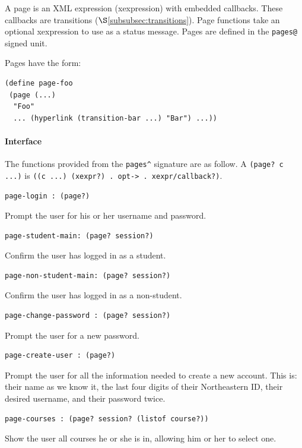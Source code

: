 \documentclass[a4paper]{article}
\begin{document}
A page is an XML expression (xexpression) with embedded callbacks. These callbacks
are transitions ($\S$\ref{subsubsec:transitions}). Page functions take an
optional xexpression to use as a status message. Pages are defined in the
\verb|pages@| signed unit.

Pages have the form:

\begin{verbatim}
(define page-foo 
 (page (...)
  "Foo"
  ... (hyperlink (transition-bar ...) "Bar") ...))
\end{verbatim}

\paragraph{Interface}\label{para:pages-interface}

The functions provided from the \verb|pages^| signature are as follow. A
\verb|(page? c ...)| is \verb|((c ...) (xexpr?) . opt-> . xexpr/callback?)|.

\begin{verbatim}
page-login : (page?)
\end{verbatim}
Prompt the user for his or her username and password.

\begin{verbatim}
page-student-main: (page? session?)
\end{verbatim}
Confirm the user has logged in as a student.

\begin{verbatim}
page-non-student-main: (page? session?)
\end{verbatim}
Confirm the user has logged in as a non-student.

\begin{verbatim}
page-change-password : (page? session?)
\end{verbatim}
Prompt the user for a new password.

\begin{verbatim}
page-create-user : (page?)
\end{verbatim}
Prompt the user for all the information needed to create a
new account. This is: their name as we know it, the last
four digits of their Northeastern ID, their desired username,
and their password twice.

\begin{verbatim}
page-courses : (page? session? (listof course?))
\end{verbatim}
Show the user all courses he or she is in, allowing him or her to select one.
\end{document}

